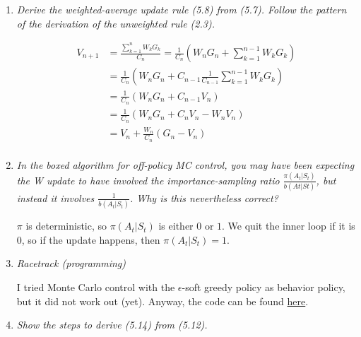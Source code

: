 \documentclass[12pt,a4paper]{article}
\begin{document}
\begin{enumerate}
  \newpage
  \item
    \textit{Derive the weighted-average update rule (5.8) from (5.7). Follow the
    pattern of the derivation of the unweighted rule (2.3).}

    \begin{align*}
      V_{n + 1} &= \frac{\sum\limits_{k = 1}^n W_k G_k}{C_n}
      = \frac{1}{C_n} \left( W_n G_n + \sum\limits_{k = 1}^{n - 1} W_k G_k\right)\\
      &= \frac{1}{C_n} \left( W_n G_n + C_{n - 1} \frac{1}{C_{n - 1}} \sum\limits_{k = 1}^{n - 1} W_k G_k \right)\\
      &= \frac{1}{C_n} \left( W_n G_n + C_{n - 1} V_n \right)\\
      &= \frac{1}{C_n} \left( W_n G_n + C_n V_n  - W_n V_n\right)\\
      &= V_n + \frac{W_n}{C_n} (G_n - V_n)\\
    \end{align*}

  \item
    \textit{In the boxed algorithm for off-policy MC control, you may have been
    expecting the W update to have involved the importance-sampling ratio
    $\frac{\pi(A_t|S_t)}{b(At|St)}$, but instead it involves $\frac{1}{b(A_t|S_t)}$.
    Why is this nevertheless correct?}

    $\pi$ is deterministic, so $\pi(A_t |S_t)$ is either $0$ or $1$. We quit the inner loop
    if it is $0$, so if the update happens, then $\pi(A_t |S_t) = 1$.

  \item
    \textit{Racetrack (programming)}

    I tried Monte Carlo control with the $\epsilon$-soft greedy policy as behavior policy, but it did not
    work out (yet). Anyway, the code can be found
    \href{https://github.com/hannagabor/SBRL/blob/master/5_12_racetrack.ipynb}{here}.

  \item
    \textit{Show the steps to derive (5.14) from (5.12).}


\end{enumerate}
\end{document}

